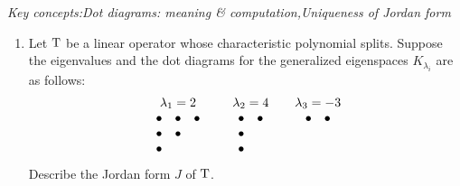 \pagebreak[3]


\begin{exercises}
	\hangindent\leftmargini\emph{Key concepts:\quad Dot diagrams: meaning \& computation,\quad Uniqueness of Jordan form}
  
	\begin{enumerate}
	  \item Let $\mathrm{T}$ be a linear operator whose characteristic polynomial splits. Suppose the eigenvalues and the dot diagrams for the generalized eigenspaces $K_{\lambda_i}$ are as follows:
	  \[
	  	\begin{array}{c@{\qquad}c@{\qquad}c}
			  \lambda_1=2&\lambda_2=4&\lambda_3=-3\\
			  \begin{array}{ccc}
				  \bullet&\bullet&\bullet\\
				  \bullet&\bullet&\\
				  \bullet&&
			  \end{array}
			  &
			  \begin{array}{cc}
				  \bullet&\bullet\\
				  \bullet&\\
				  \bullet&
			  \end{array}
			  &
			  \begin{array}{cc}
				  \bullet&\bullet\\
				  &\\
				  &
		  	\end{array}
	  	\end{array}
	  \]
	  Describe the Jordan form $J$ of $\mathrm{T}$.
  

\end{enumerate}
\end{exercises}
